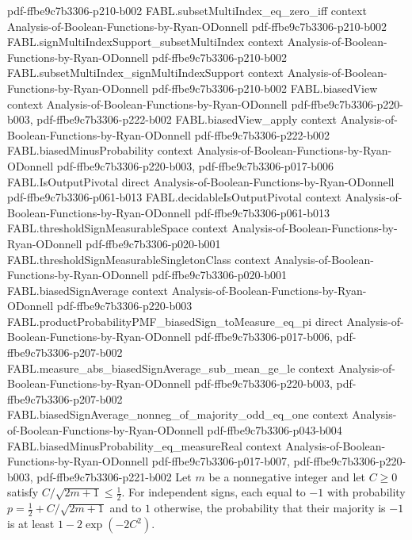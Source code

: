 \begin{theorem}
  {pdf-ffbe9c7b3306-p210-b002}
\proofstep
  {FABL.subsetMultiIndex_eq_zero_iff}
  {context}
  {Analysis-of-Boolean-Functions-by-Ryan-ODonnell}
  {pdf-ffbe9c7b3306-p210-b002}
\proofstep
  {FABL.signMultiIndexSupport_subsetMultiIndex}
  {context}
  {Analysis-of-Boolean-Functions-by-Ryan-ODonnell}
  {pdf-ffbe9c7b3306-p210-b002}
\proofstep
  {FABL.subsetMultiIndex_signMultiIndexSupport}
  {context}
  {Analysis-of-Boolean-Functions-by-Ryan-ODonnell}
  {pdf-ffbe9c7b3306-p210-b002}
\proofstep
  {FABL.biasedView}
  {context}
  {Analysis-of-Boolean-Functions-by-Ryan-ODonnell}
  {pdf-ffbe9c7b3306-p220-b003,
    pdf-ffbe9c7b3306-p222-b002}
\proofstep
  {FABL.biasedView_apply}
  {context}
  {Analysis-of-Boolean-Functions-by-Ryan-ODonnell}
  {pdf-ffbe9c7b3306-p222-b002}
\proofstep
  {FABL.biasedMinusProbability}
  {context}
  {Analysis-of-Boolean-Functions-by-Ryan-ODonnell}
  {pdf-ffbe9c7b3306-p220-b003,
    pdf-ffbe9c7b3306-p017-b006}
\proofstep
  {FABL.IsOutputPivotal}
  {direct}
  {Analysis-of-Boolean-Functions-by-Ryan-ODonnell}
  {pdf-ffbe9c7b3306-p061-b013}
\proofstep
  {FABL.decidableIsOutputPivotal}
  {context}
  {Analysis-of-Boolean-Functions-by-Ryan-ODonnell}
  {pdf-ffbe9c7b3306-p061-b013}
\proofstep
  {FABL.thresholdSignMeasurableSpace}
  {context}
  {Analysis-of-Boolean-Functions-by-Ryan-ODonnell}
  {pdf-ffbe9c7b3306-p020-b001}
\proofstep
  {FABL.thresholdSignMeasurableSingletonClass}
  {context}
  {Analysis-of-Boolean-Functions-by-Ryan-ODonnell}
  {pdf-ffbe9c7b3306-p020-b001}
\proofstep
  {FABL.biasedSignAverage}
  {context}
  {Analysis-of-Boolean-Functions-by-Ryan-ODonnell}
  {pdf-ffbe9c7b3306-p220-b003}
\proofstep
  {FABL.productProbabilityPMF_biasedSign_toMeasure_eq_pi}
  {direct}
  {Analysis-of-Boolean-Functions-by-Ryan-ODonnell}
  {pdf-ffbe9c7b3306-p017-b006,
    pdf-ffbe9c7b3306-p207-b002}
\proofstep
  {FABL.measure_abs_biasedSignAverage_sub_mean_ge_le}
  {context}
  {Analysis-of-Boolean-Functions-by-Ryan-ODonnell}
  {pdf-ffbe9c7b3306-p220-b003,
    pdf-ffbe9c7b3306-p207-b002}
\proofstep
  {FABL.biasedSignAverage_nonneg_of_majority_odd_eq_one}
  {context}
  {Analysis-of-Boolean-Functions-by-Ryan-ODonnell}
  {pdf-ffbe9c7b3306-p043-b004}
\proofstep
  {FABL.biasedMinusProbability_eq_measureReal}
  {context}
  {Analysis-of-Boolean-Functions-by-Ryan-ODonnell}
  {pdf-ffbe9c7b3306-p017-b007,
    pdf-ffbe9c7b3306-p220-b003,
    pdf-ffbe9c7b3306-p221-b002}
Let $m$ be a nonnegative integer and let $C\geq0$ satisfy $C/\sqrt{2m+1}\leq\frac12$.
For independent signs, each equal to $-1$ with probability $p=\frac12+C/\sqrt{2m+1}$ and
to $1$ otherwise, the probability that their majority is $-1$ is at least
$1-2\exp(-2C^2)$.
\end{theorem}

